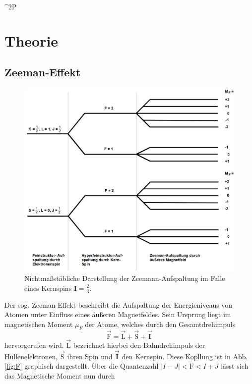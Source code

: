 ^2{P}\section{Theorie}
\label{sec:Theorie}

\subsection{Zeeman-Effekt}
\begin{figure}
  \includegraphics{./Niveaus.PNG}
  \caption{Nichtmaßstäbliche Darstellung der Zeemann-Aufspaltung im Falle eines Kernspins $\mathbf{I}= \frac{2}{3}$\cite{Anleitung}.}
  \label{fig:Zeemann}
\end{figure}
Der sog. Zeeman-Effekt beschreibt die Aufspaltung der Energieniveaus von Atomen unter Einfluss eines äußeren Magnetfeldes.
Sein Ursprung liegt im magnetischen Moment $\mu_F$ der Atome, welches durch den Gesamtdrehimpuls
\begin{equation}
  \vec{\text{F}}=\vec{\text{L}}+\vec{\text{S}}+\vec{\mathbf{I}}
  \label{eqn:F}
\end{equation}
hervorgerufen wird. $\vec{\text{L}}$ bezeichnet hierbei den Bahndrehimpuls der Hüllenelektronen, $\vec{\text{S}}$ ihren Spin und $\vec{\mathbf{I}}$ den Kernspin. Diese Kopllung ist in Abb. \ref{fig:F} graphisch dargestellt.
Über die Quantenzahl $|I-J|<\text{F}<I+J$ lässt sich das Magnetische Moment nun durch

